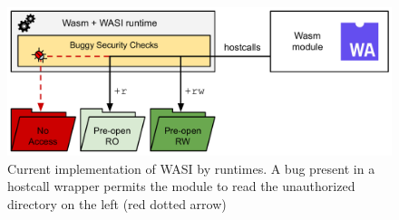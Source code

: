 \begin{figure}[t!]
	\includegraphics[width=\columnwidth]{chapters/wasm/fig/wasi}
	\caption[Current implementation of WASI by runtimes]{
    Current implementation of WASI by runtimes. A bug present in a
    hostcall wrapper permits the module to read the unauthorized
    directory on the left (red dotted arrow)
  }
	\label{fig:wasi}
\end{figure}



